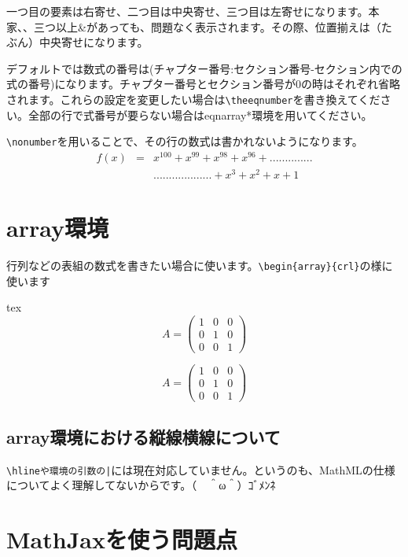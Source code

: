 一つ目の要素は右寄せ、二つ目は中央寄せ、三つ目は左寄せになります。本家、、三つ以上&があっても、問題なく表示されます。その際、位置揃えは（たぶん）中央寄せになります。

デフォルトでは数式の番号は(チャプター番号:セクション番号-セクション内での式の番号)になります。チャプター番号とセクション番号が0の時はそれぞれ省略されます。これらの設定を変更したい場合は\verb+\theeqnumber+を書き換えてください。全部の行で式番号が要らない場合はeqnarray*環境を用いてください。

\verb+\nonumber+を用いることで、その行の数式は書かれないようになります。
\begin{eqnarray}
  f(x)&=&x^{100}+x^{99}+x^{98}+x^{96}+..............\nonumber\\
  &&...................+x^3+x^2+x+1
\end{eqnarray}

\section{array環境}
行列などの表組の数式を書きたい場合に使います。\verb+\begin{array}{crl}+の様に使います

\begin{code}{tex}
$$
A = \left(
  \begin{array}{ccc}
    1 & 0 & 0\\
    0 & 1 & 0\\
    0 & 0& 1
  \end{array}\right)
$$
\end{code}

$$
A = \left(
  \begin{array}{ccc}
    1 & 0 & 0\\
    0 & 1 & 0\\
    0 & 0& 1
  \end{array}\right)
$$

\subsection{array環境における縦線横線について}

\verb+\hlineや環境の引数の|+には現在対応していません。というのも、MathMLの仕様についてよく理解してないからです。（　＾ω＾）ｺﾞﾒﾝﾈ

\section{MathJaxを使う問題点}

